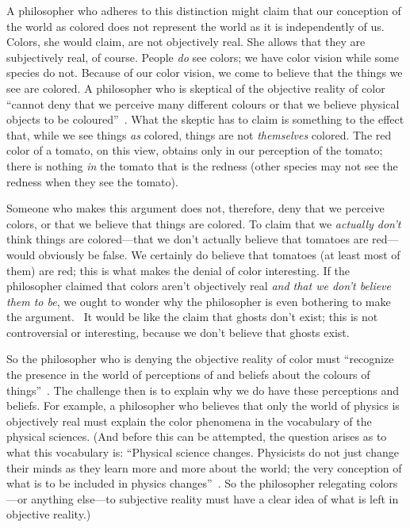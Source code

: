 \documentclass[11pt]{article}
\begin{document}
\begin{spacing}{1.5}
A philosopher who adheres to this distinction might claim that our conception of the world as colored does not represent the world as it is independently of us. Colors, she would claim, are not objectively real. She allows that they are subjectively real, of course. People {\em do} see colors; we have color vision while some species do not. Because of our color vision, we come to believe that the things we see are colored. A philosopher who is skeptical of the objective reality of color ``cannot deny that we perceive many different colours or that we believe physical objects to be coloured''~\citep[145]{stroud2000a}. What the skeptic has to claim is something to the effect that, while we see things {\em as} colored, things are not {\em themselves} colored. The red color of a tomato, on this view, obtains only in our perception of the tomato; there is nothing {\em in} the tomato that is the redness (other species may not see the redness when they see the tomato).%

Someone who makes this argument does not, therefore, deny that we perceive colors, or that we believe that things are colored. To claim that we {\em actually don't} think things are colored---that we don't actually believe that tomatoes are red---would obviously be false. We certainly do believe that tomatoes (at least most of them) are red; this is what makes the denial of color interesting. If the philosopher claimed that colors aren't objectively real {\em and that we don't believe them to be}, we ought to wonder why the philosopher is even bothering to make the argument.%
%
%
\ It would be like the claim that ghosts don't exist; this is not controversial or interesting, because we don't believe that ghosts exist.

So the philosopher who is denying the objective reality of color must ``recognize the presence in the world of perceptions of and beliefs about the colours of things''~\citep[199]{stroud2000a}. The challenge then is to explain why we do have these perceptions and beliefs. For example, a philosopher who believes that only the world of physics is objectively real must explain the color phenomena in the vocabulary of the physical sciences. (And before this can be attempted, the question arises as to what this vocabulary is: ``Physical science changes. Physicists do not just change their minds as they learn more and more about the world; the very conception of what is to be included in physics changes''~\citep[53]{stroud2000a}. So the philosopher relegating colors---or anything else---to subjective reality must have a clear idea of what is left in objective reality.)%


\end{spacing}
\end{document}
